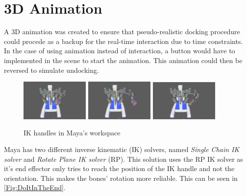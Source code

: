 \section*{3D Animation}
A 3D animation was created to ensure that pseudo-realistic docking procedure could procede as a backup for the real-time interaction due to time constraints. In the case of using animation instead of interaction, a button would have to implemented in the scene to start the animation. This animation could then be reversed to simulate undocking.

\begin{figure}[hpbt]
	\centering
	\includegraphics[width=0.3\textwidth]{ModelAnim/IK1}
	\includegraphics[width=0.3\textwidth]{ModelAnim/IK2}
	\includegraphics[width=0.3\textwidth]{ModelAnim/IK3}
	\caption{IK handles in Maya's workspace}
	\label{Fig:DoItInTheEnd}
\end{figure}

Maya has two different inverse kinematic (IK) solvers, named \textit{Single Chain IK solver} and \textit{Rotate Plane IK solver} (RP). This solution uses the RP IK solver as it's end effector only tries to reach the position of the IK handle and not the orientation. This makes the bones' rotation more reliable. This can be seen in \autoref{Fig:DoItInTheEnd}.